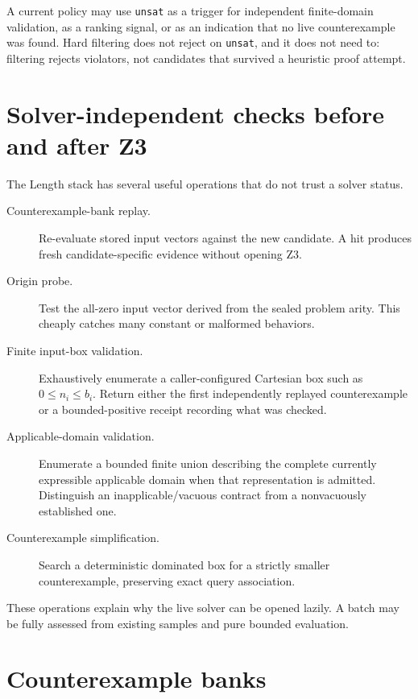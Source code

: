 \documentclass[10pt,letterpaper,oneside]{report}
\newcommand{\unsat}{\texttt{unsat}}
\begin{document}
A current policy may use \unsat{} as a trigger for independent finite-domain validation, as a ranking signal, or as an indication that no live counterexample was found. Hard filtering does not reject on \unsat{}, and it does not need to: filtering rejects violators, not candidates that survived a heuristic proof attempt.

\section{Solver-independent checks before and after Z3}

The Length stack has several useful operations that do not trust a solver status.

\begin{description}
\item[Counterexample-bank replay.] Re-evaluate stored input vectors against the new candidate. A hit produces fresh candidate-specific evidence without opening Z3.

\item[Origin probe.] Test the all-zero input vector derived from the sealed problem arity. This cheaply catches many constant or malformed behaviors.

\item[Finite input-box validation.] Exhaustively enumerate a caller-configured Cartesian box such as $0\le n_i\le b_i$. Return either the first independently replayed counterexample or a bounded-positive receipt recording what was checked.

\item[Applicable-domain validation.] Enumerate a bounded finite union describing the complete currently expressible applicable domain when that representation is admitted. Distinguish an inapplicable/vacuous contract from a nonvacuously established one.

\item[Counterexample simplification.] Search a deterministic dominated box for a strictly smaller counterexample, preserving exact query association.
\end{description}

These operations explain why the live solver can be opened lazily. A batch may be fully assessed from existing samples and pure bounded evaluation.

\section{Counterexample banks}
\end{document}
